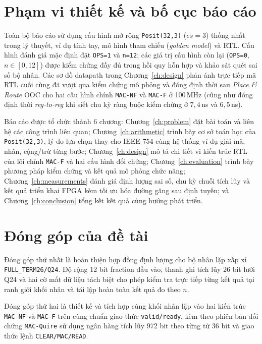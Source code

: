 \section{Phạm vi thiết kế và bố cục báo cáo}

Toàn bộ báo cáo sử dụng cấu hình mở rộng \texttt{Posit(32,3)} ($es=3$) thống nhất trong lý thuyết,
ví dụ tính tay, mô hình tham chiếu (\textit{golden model}) và RTL. Cấu hình đánh
giá mặc định đặt \texttt{OPS=1} và \texttt{n=12}; các giá trị cấu hình còn lại
(\texttt{OPS=0}, $n\in[0,12]$) được kiểm chứng đầy đủ trong hồi quy hỗn hợp và
khảo sát quét sai số bộ nhân. Các sơ đồ datapath trong Chương~\ref{ch:design} phản
ánh trực tiếp mã RTL cuối cùng đã vượt qua kiểm chứng mô phỏng và đóng định thời
sau \textit{Place \& Route} OOC cho hai cấu hình chính \texttt{MAC-NF} và \texttt{MAC-F} ở 100\,MHz (cũng như đóng định thời \textit{reg-to-reg} khi siết chu kỳ ràng buộc kiểm chứng ở $7{,}4$\,ns và $6{,}5$\,ns).

Báo cáo được tổ chức thành 6 chương: Chương~\ref{ch:problem} đặt bài toán và
liên hệ các công trình liên quan; Chương~\ref{ch:arithmetic} trình bày cơ sở
toán học của \texttt{Posit(32,3)}, lý do lựa chọn thay cho IEEE-754 cùng hệ thống
ví dụ giải mã, nhân, cộng/trừ từng bước; Chương~\ref{ch:design} mô tả chi tiết
vi kiến trúc RTL của lõi chính \texttt{MAC-F} và hai cấu hình đối chứng;
Chương~\ref{ch:evaluation} trình bày phương pháp kiểm chứng và kết quả mô phỏng
chức năng; Chương~\ref{ch:measurements} đánh giá định lượng sai số, chu kỳ chuỗi
tích lũy và kết quả triển khai FPGA kèm tối ưu hóa đường găng sau định tuyến; và
Chương~\ref{ch:conclusion} tổng kết kết quả cùng hướng phát triển.

\section{Đóng góp của đề tài}

Đóng góp thứ nhất là hoàn thiện hợp đồng định lượng cho bộ nhân lặp xấp xỉ
\texttt{FULL\_TERM26/Q24}. Độ rộng 12 bit fraction đầu vào, thanh ghi tích lũy
26 bit lưới Q24 và hai cờ mất dữ liệu tách biệt cho phép kiểm tra trực tiếp
từng kết quả tại ranh giới khối nhân và tái lập hoàn toàn kết quả đo theo $n$.

Đóng góp thứ hai là thiết kế và tích hợp cùng khối nhân lặp vào hai kiến trúc
\texttt{MAC-NF} và \texttt{MAC-F} trên cùng chuẩn giao thức \texttt{valid/ready},
kèm theo phiên bản đối chứng \texttt{MAC-Quire} sử dụng ngân hàng tích lũy 972 bit
theo từng từ 36 bit và giao thức lệnh \texttt{CLEAR/MAC/READ}.

